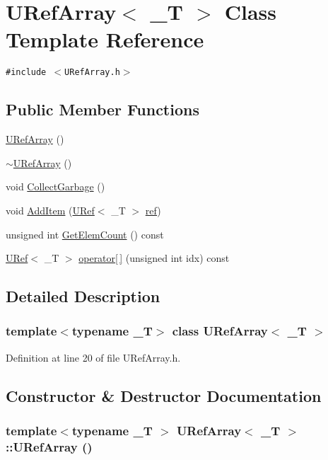 \hypertarget{class_u_ref_array}{
\section{URefArray$<$ \_\-T $>$ Class Template Reference}
\label{class_u_ref_array}
}
{\tt \#include $<$URefArray.h$>$}

\subsection*{Public Member Functions}
\begin{CompactItemize}
\item 
\hyperlink{class_u_ref_array_a6ab0047d31674370431f55f52b3fd6f}{URefArray} ()
\item 
\hyperlink{class_u_ref_array_86c8cb2dce43147ed9e25e81993fab12}{$\sim$URefArray} ()
\item 
void \hyperlink{class_u_ref_array_d45fce6eff4609721d8d66007ce01613}{CollectGarbage} ()
\item 
void \hyperlink{class_u_ref_array_21c0e5f6c72001bba3a83e91db39874e}{AddItem} (\hyperlink{class_u_ref}{URef}$<$ \_\-T $>$ \hyperlink{glext__bak_8h_083de4c8e32ad3d9059245f26be721de}{ref})
\item 
unsigned int \hyperlink{class_u_ref_array_8de496e80b8cd87ec57271cebcf7e1b0}{GetElemCount} () const 
\item 
\hyperlink{class_u_ref}{URef}$<$ \_\-T $>$ \hyperlink{class_u_ref_array_468a468a3897571297028515744adbad}{operator\mbox{[}$\,$\mbox{]}} (unsigned int idx) const 
\end{CompactItemize}


\subsection{Detailed Description}
\subsubsection*{template$<$typename \_\-T$>$ class URefArray$<$ \_\-T $>$}



Definition at line 20 of file URefArray.h.

\subsection{Constructor \& Destructor Documentation}
\hypertarget{class_u_ref_array_a6ab0047d31674370431f55f52b3fd6f}{
\subsubsection[{URefArray}]{\setlength{\rightskip}{0pt plus 5cm}template$<$typename \_\-T $>$ {\bf URefArray}$<$ \_\-T $>$::{\bf URefArray} ()}}
\label{class_u_ref_array_a6ab0047d31674370431f55f52b3fd6f}




